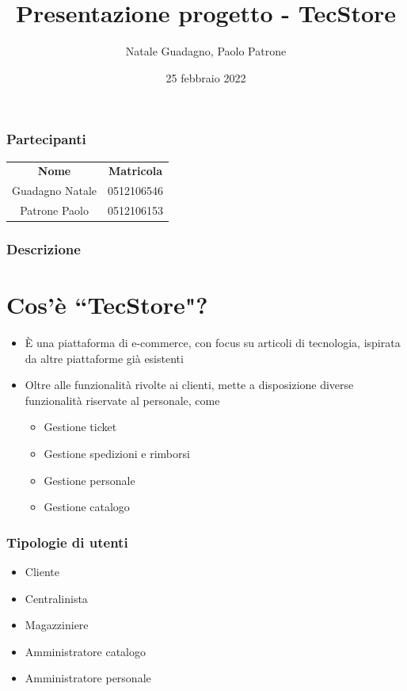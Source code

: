 \documentclass[12pt,a4paper]{beamer}
\author{Natale Guadagno, Paolo Patrone}
\title{Presentazione progetto - TecStore}
\date {25 febbraio 2022}
\begin{document}
\begin{frame}
\maketitle
\end{frame}

\begin{frame}
\frametitle{Partecipanti}
\begin{center}
\begin{tabular} {cc}
\textbf{Nome} & \textbf{Matricola} \\
Guadagno Natale & 0512106546 \\
Patrone Paolo & 0512106153 \\
\end{tabular}
\end{center}
\end{frame}

\begin{frame}
\frametitle{Descrizione}
\section{Cos'\`e ``TecStore"?}
\begin{itemize}
\item \`E una piattaforma di e-commerce, con focus su articoli di tecnologia, ispirata da altre piattaforme gi\`a esistenti
\item Oltre alle funzionalit\`a rivolte ai clienti, mette a disposizione diverse funzionalit\`a riservate al personale, come  \\ \begin{minipage}{5cm}
\begin{itemize}
\item Gestione ticket
\item Gestione spedizioni e rimborsi
\item Gestione personale
\item Gestione catalogo
\end{itemize}
\end{minipage}
\end{itemize}
\end{frame}

\begin{frame}
\frametitle{Tipologie di utenti}

\begin{itemize}
\item Cliente
\item Centralinista
\item Magazziniere
\item Amministratore catalogo
\item Amministratore personale
\end{itemize}
\end{frame}
\end{document}
